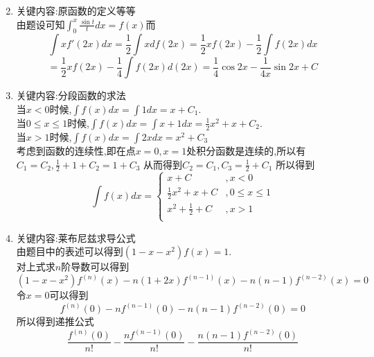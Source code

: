 \documentclass[UTF8,a4paper,10pt]{ctexart}
\begin{document}
\begin{flushleft}
\begin{enumerate}
\begin{enumerate}
\begin{equation}
				\end{equation}
			\end{enumerate}
			\item 关键内容:原函数的定义等等\\
				由题设可知$\int_{0}^{x}{\frac{\sin{t}}{t}dx=f(x)}$而
				\begin{equation}
					\int{xf{'}(2x)}dx=\frac{1}{2}\int{x}df(2x)=\frac{1}{2}xf(2x)-\frac{1}{2}\int{f(2x)}dx\nonumber
				\end{equation}
				\begin{equation}
					=\frac{1}{2}xf(2x)-\frac{1}{4}\int{f(2x)}d(2x)=\frac{1}{4}\cos{2x}-\frac{1}{4x}\sin{2x}+C\nonumber
				\end{equation}
			\item 关键内容:分段函数的求法\\
				当$x<0$时候,$\int{f(x)}dx=\int{1}dx=x+C_{1}$.\\
				当$0\leq{x}\leq{1}$时候,$\int{f(x)}dx=\int{x+1}dx=\frac{1}{2}x^{2}+x+C_{2}$.\\
				当$x>1$时候,$\int{f(x)}dx=\int{2x}dx=x^{2}+C_{3}$\\
				考虑到函数的连续性,即在点$x=0,x=1$处积分函数是连续的,所以有$C_{1}=C_{2},\frac{1}{2}+1+C_{2}=1+C_{3}$
				从而得到$C_{2}=C_{1},C_{3}=\frac{1}{2}+C_{1}$
				所以得到
				\begin{equation}
					\int{f(x)}dx=\begin{cases}
						x+C&,x<0\\
						\frac{1}{2}x^{2}+x+C&,0\leq{x}\leq{1}\\
						x^{2}+\frac{1}{2}+C&,x>1\\
					\end{cases}\nonumber
				\end{equation}
			\item 关键内容:莱布尼兹求导公式\\
			由题目中的表述可以得到$(1-x-x^{2})f(x)=1$.\\
			对上式求$n$阶导数可以得到
			\begin{equation}
			(1-x-x^{2})f^{(n)}(x)-n(1+2x)f^{(n-1)}(x)-n(n-1)f^{(n-2)}(x)=0\nonumber
			\end{equation}
			令$x=0$可以得到
			\begin{equation}
			f^{(n)}(0)-nf^{(n-1)}(0)-n(n-1)f^{(n-2)}(0)=0\nonumber
			\end{equation}
			所以得到递推公式
			\begin{equation}
			\frac{f^{(n)}(0)}{n!}-\frac{nf^{(n-1)}(0)}{n!}-\frac{n(n-1)f^{(n-2)}(0)}{n!}\nonumber
			\end{equation}

\end{enumerate}
\end{flushleft}
\end{document}

